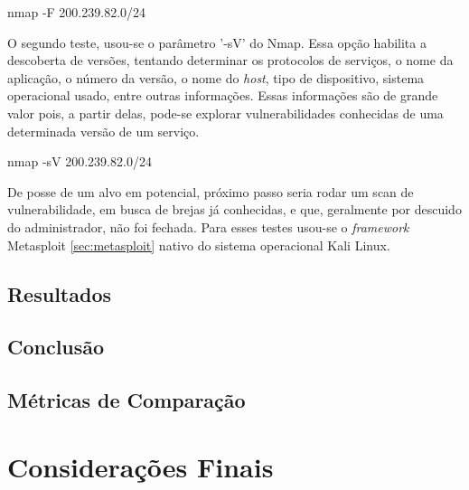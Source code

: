 \documentclass[
	12pt,				
	openright,		
	twoside,	
	a4paper,
	english,	
	brazil	
	]{abntex2}
\begin{document}
nmap -F 200.239.82.0/24

O segundo teste, usou-se o parâmetro '-sV' do Nmap. Essa opção habilita a descoberta de versões, tentando determinar os protocolos de serviços, o nome da aplicação, o número da versão, o nome do \textit{host}, tipo de dispositivo, sistema operacional usado, entre outras informações. Essas informações são de grande valor pois, a partir delas, pode-se explorar vulnerabilidades conhecidas de uma determinada versão de um serviço.

nmap -sV 200.239.82.0/24

De posse de um alvo em potencial, próximo passo seria rodar um scan de vulnerabilidade, em busca de brejas já conhecidas, e que, geralmente por descuido do administrador, não foi fechada. Para esses testes usou-se o \textit{framework} Metasploit \ref{sec:metasploit} nativo do sistema operacional Kali Linux.



\section{Resultados} \label{sec:resultados}
\section{Conclusão} \label{sec:conclusão}
\section{Métricas de Comparação}
\chapter{Considerações Finais} \label{considerações}
\postextual

\printindex
\end{document}
